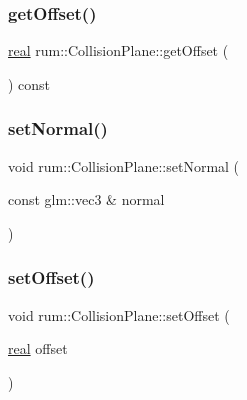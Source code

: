 \mbox{\label{classrum_1_1_collision_plane_a348709c5d226023ce51d17a0fdfbe408}} 
\subsubsection{\texorpdfstring{get\+Offset()}{getOffset()}}
{\footnotesize\ttfamily \mbox{\hyperlink{namespacerum_a7e8cca23573d5eaead0f138cbaa4862c}{real}} rum\+::\+Collision\+Plane\+::get\+Offset (\begin{DoxyParamCaption}{ }\end{DoxyParamCaption}) const}

\mbox{\label{classrum_1_1_collision_plane_ade1d578943c87eba3f49134f6e19148d}} 
\subsubsection{\texorpdfstring{set\+Normal()}{setNormal()}}
{\footnotesize\ttfamily void rum\+::\+Collision\+Plane\+::set\+Normal (\begin{DoxyParamCaption}\item[{const glm\+::vec3 \&}]{normal }\end{DoxyParamCaption})}

\mbox{\label{classrum_1_1_collision_plane_aeaa1d14df4d33c30a7495e72ff5fa454}} 
\subsubsection{\texorpdfstring{set\+Offset()}{setOffset()}}
{\footnotesize\ttfamily void rum\+::\+Collision\+Plane\+::set\+Offset (\begin{DoxyParamCaption}\item[{\mbox{\hyperlink{namespacerum_a7e8cca23573d5eaead0f138cbaa4862c}{real}}}]{offset }\end{DoxyParamCaption})}



